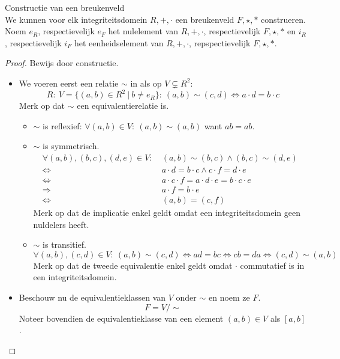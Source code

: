\documentclass[main.tex]{subfiles}
\begin{document}
\begin{st}
  Constructie van een breukenveld\\
  We kunnen voor elk integriteitsdomein $R,+,\cdot$ een breukenveld $F,\star,*$ construeren.
  Noem $e_{R}$, respectievelijk $e_{F}$ het nulelement van $R,+,\cdot$, respectievelijk $F,\star,*$ en $i_{R}$, respectievelijk $i_{F}$ het eenheidselement van $R,+,\cdot$, repspectievelijk $F,\star,*$.
  \begin{proof}
    Bewijs door constructie.
    \begin{itemize}
    \item We voeren eerst een relatie $\sim$ in als op $V\subsetneq R^{2}$:
      \[ R:\ V = \{ (a,b) \in R^{2} \ |\ b \neq e_{R} \}:\ (a,b) \sim (c,d) \Leftrightarrow a\cdot d = b\cdot c \]
      Merk op dat $\sim$ een equivalentierelatie is.
      \begin{itemize}
      \item $\sim$ is reflexief: $\forall (a,b) \in V:\ (a,b) \sim (a,b)$ want $ab = ab$.
      \item $\sim$ is symmetrisch.\\
        \[
        \begin{array}{rl}
          \forall (a,b), (b,c), (d,e) \in V:\ & (a,b) \sim (b,c) \wedge (b,c) \sim (d,e)\\
          \Leftrightarrow & a\cdot d = b\cdot c \wedge c\cdot f = d\cdot e\\
          \Leftrightarrow & a\cdot c \cdot f = a\cdot d \cdot e = b \cdot c \cdot e\\
          \Rightarrow & a\cdot f = b \cdot e\\
          \Leftrightarrow & (a,b) = (c,f)
        \end{array}
        \]
        Merk op dat de implicatie enkel geldt omdat een integriteitsdomein geen nuldelers heeft.
      \item $\sim$ is transitief.\\
        \[ \forall (a,b), (c,d) \in V:\ (a,b) \sim (c,d) \Leftrightarrow ad = bc \Leftrightarrow cb = da \Leftrightarrow (c,d) \sim (a,b) \]
        Merk op dat de tweede equivalentie enkel geldt omdat $\cdot$ commutatief is in een integriteitsdomein. 
      \end{itemize}
    \item Beschouw nu de equivalentieklassen van $V$ onder $\sim$ en noem ze $F$.
      \[ F = V/\sim \]
      Noteer bovendien de equivalentieklasse van een element $(a,b)\in V$ als $[a,b]$.
      \begin{itemize}

\end{itemize}
\end{itemize}
\end{proof}
\end{st}
\end{document}
